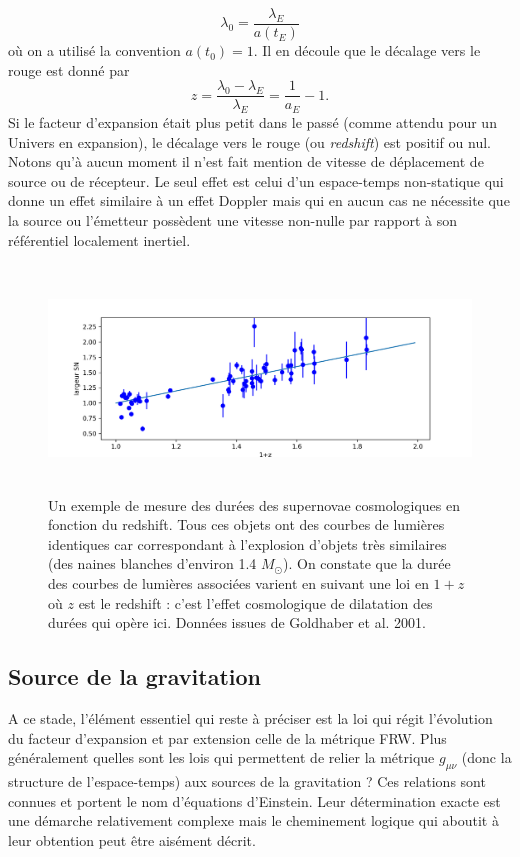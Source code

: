 \begin{equation}
\lambda_0=\frac{\lambda_E}{a(t_E)}
\end{equation}
où on a utilisé la convention $a(t_0)=1$. Il en découle que le décalage vers le rouge est donné par
\begin{equation}
z = \frac{\lambda_0-\lambda_E}{\lambda_E}=\frac{1}{a_E}-1.
\end{equation}
Si le facteur d'expansion était plus petit dans le passé (comme attendu pour un Univers en expansion), le décalage vers le rouge (ou \textit{redshift}) est positif ou nul. Notons qu'à aucun moment il n'est fait mention de vitesse de déplacement de source ou de récepteur. Le seul effet est celui d'un espace-temps non-statique qui donne un effet similaire à un effet Doppler mais qui en aucun cas ne nécessite que la source ou l'émetteur possèdent une vitesse non-nulle par rapport à son référentiel localement inertiel.

\begin{figure}[htbp]
	\centering
		\includegraphics[height=6cm]{figs/wSN.png}
	\caption[Durée des supernovaes en fonction du redshift]{Un exemple de mesure des durées des supernovae cosmologiques en fonction du redshift. Tous ces objets ont des courbes de lumières identiques car correspondant à l'explosion d'objets très similaires (des naines blanches d'environ 1.4 $M_\odot$). On constate que la durée des courbes de lumières associées varient en suivant une loi en $1+z$ où $z$ est le redshift : c'est l'effet cosmologique de dilatation des durées qui opère ici. Données issues de Goldhaber et al. 2001.}
	\label{f:wSN}
\end{figure}

\subsection{Source de la gravitation}
A ce stade, l'élément essentiel qui reste à préciser est la loi qui régit l'évolution du facteur d'expansion et par extension celle de la métrique FRW. Plus généralement quelles sont les lois qui permettent de relier la métrique $g_{\mu\nu}$ (donc la structure de l'espace-temps) aux sources de la gravitation ? Ces relations sont connues et portent le nom d'équations d'Einstein. Leur détermination exacte est une démarche relativement complexe mais le cheminement logique qui aboutit à leur obtention peut être aisément décrit. 

